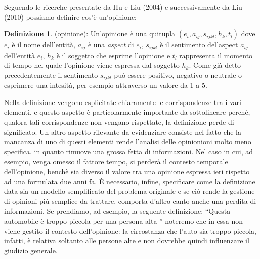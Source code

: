 \documentclass[a4paper,12pt,openright,twoside]{report}
\theoremstyle{definition}
\newtheorem{defi}{Definizione}[section]
\begin{document}
Seguendo le ricerche presentate da Hu e Liu (2004) e successivamente da Liu (2010) possiamo
definire cos'è un'opinione:

\begin{defi}(opinione): Un'opinione è una quitupla $(e_i, a_{ij}, s_{ijkl}, h_k, t_l)$ dove
	$e_i$ è il nome dell'entità, $a_{ij}$ è una \emph{aspect} di $e_i$, $s_{ijkl}$ è il
	sentimento del'aspect $a_{ij}$ dell'entità $e_i$, $h_k$ è il soggetto che esprime l'opinione e $t_l$
rappresenta il momento di tempo nel quale l'opinione viene espressa dal soggetto $h_k$.
Come già detto precedentemente il sentimento $s_{ijkl}$ può essere positivo, negativo o neutrale o esprimere una intesità,
per esempio attraverso un valore da 1 a 5.
\end{defi}

Nella definizione vengono esplicitate chiaramente le corrispondenze tra i vari elementi,
e questo aspetto è particolarmente importante da sottolineare perché, 
qualora tali corrispondenze non vengano rispettate,
la definizione perde di significato.
Un altro aspetto rilevante da evidenziare consiste nel fatto che la mancanza di uno di questi elementi rende 
l'analisi delle opinionioni molto meno specifica, in quanto rimuove una grossa fetta di
informazioni. Nel caso in cui, ad esempio, venga omesso il fattore tempo, si perderà il contesto
temporale dell'opinione, benchè sia diverso il valore tra una opinione espressa ieri rispetto ad una
formulata due anni fa.
\`E necessario, infine, specificare come la definizione data sia un modello semplificato del problema
originale e se ciò rende la gestione di opinioni più semplice da trattare,
comporta d'altro canto anche una perdita di informazioni. Se prendiamo, ad esempio, la seguente definizione:
``Questa automobile è troppo piccola per una persona alta ''
noteremo che in essa non viene gestito il contesto dell’opinione: la circostanza che l’auto sia troppo piccola, 
infatti, è relativa soltanto alle persone alte e non dovrebbe quindi influenzare il giudizio generale.
\end{document}
